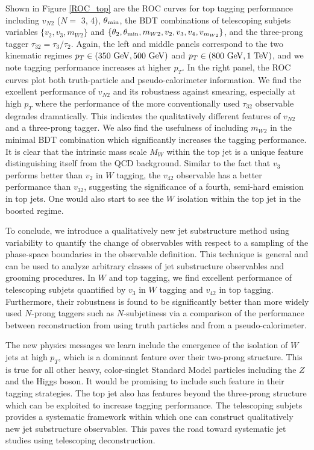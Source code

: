 \documentclass[aps,prl,floatfix,preprintnumbers,twocolumn,groupedaddress,nofootinbib]{revtex4-1}
\begin{document}
Shown in Figure \ref{ROC_top} are the ROC curves for top tagging performance including $v_{N2}$ ($N = $ 3, 4), $\theta_{\rm min}$, the BDT combinations of telescoping subjets variables $\{v_2, v_3, m_{W2}\}$ and $\{\theta_2,\theta_{\rm min},m_{W2},v_2,v_3,v_4,v_{m_{W2}}\}$, and the three-prong tagger $\tau_{32}=\tau_{3}/\tau_{2}$. Again, the left and middle panels correspond to the two kinematic regimes $p_T \in (350~{\rm GeV}, 500~{\rm GeV})$ and $p_T \in (800~{\rm GeV}, 1~{\rm TeV})$, and we note tagging performance increases at higher $p_T$. In the right panel, the ROC curves plot both truth-particle and pseudo-calorimeter information. We find the excellent performance of $v_{N2}$ and its robustness against smearing, especially at high $p_T$ where the performance of the more conventionally used $\tau_{32}$ observable degrades dramatically. This indicates the qualitatively different features of $v_{N2}$ and a three-prong tagger. We also find the usefulness of including $m_{W2}$ in the minimal BDT combination which significantly increases the tagging performance. It is clear that the intrinsic mass scale $M_W$ within the top jet is a unique feature distinguishing itself from the QCD background. Similar to the fact that $v_3$ performs better than $v_2$ in $W$ tagging, the $v_{42}$ observable has a better performance than $v_{32}$, suggesting the significance of a fourth, semi-hard emission in top jets. One would also start to see the $W$ isolation within the top jet in the boosted regime.

To conclude, we introduce a qualitatively new jet substructure method using variability to quantify the change of observables with respect to a sampling of the phase-space boundaries in the observable definition. This technique is general and can be used to analyze arbitrary classes of jet substructure observables and grooming procedures. In $W$ and top tagging, we find excellent performance of telescoping subjets quantified by $v_3$ in $W$ tagging and $v_{42}$ in top tagging. Furthermore, their robustness is found to be significantly better than more widely used $N$-prong taggers such as $N$-subjetiness via a comparison of the performance between reconstruction from using truth particles and from a pseudo-calorimeter.

The new physics messages we learn include the emergence of the isolation of $W$ jets at high $p_T$, which is a dominant feature over their two-prong structure. This is true for all other heavy, color-singlet Standard Model particles including the $Z$ and the Higgs boson. It would be promising to include such feature in their tagging strategies. The top jet also has features beyond the three-prong structure which can be exploited to increase tagging performance. The telescoping subjets provides a systematic framework within which one can construct qualitatively new jet substructure observables. This paves the road toward systematic jet studies using telescoping deconstruction.
\end{document}
